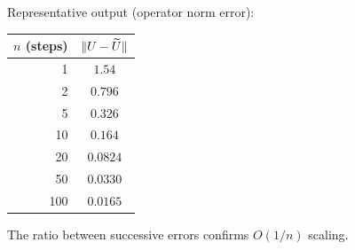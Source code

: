 \documentclass[12pt,oneside]{amsart}
\begin{document}
\begin{solution}
  Representative output (operator norm error):
  \begin{center}
    \begin{tabular}{rc}
      \toprule
      $n$ (steps) & $\lVert U - \widetilde{U} \rVert$ \\
      \midrule
      1   & $1.54$ \\
      2   & $0.796$ \\
      5   & $0.326$ \\
      10  & $0.164$ \\
      20  & $0.0824$ \\
      50  & $0.0330$ \\
      100 & $0.0165$ \\
      \bottomrule
    \end{tabular}
  \end{center}
  The ratio between successive errors confirms $O(1/n)$ scaling.
\end{solution}
\end{document}
